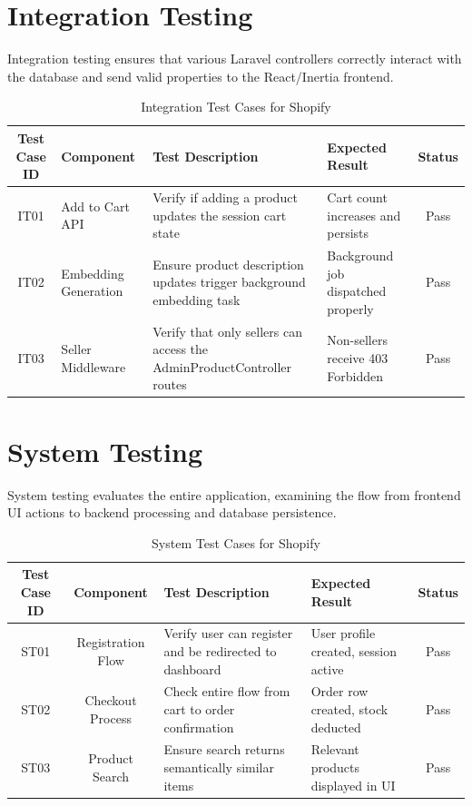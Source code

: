 \section{Integration Testing}
Integration testing ensures that various Laravel controllers correctly interact with the database and send valid properties to the React/Inertia frontend.
\begin{table}[H]
    \centering
    \renewcommand{\arraystretch}{1.3}
    \small
    \begin{tabular}{|c|p{3cm}|p{3cm}|p{3cm}|c|}
        \hline
        \textbf{Test Case ID} & \textbf{Component} & \textbf{Test Description} & \textbf{Expected Result} & \textbf{Status} \\
        \hline
        IT01 & Add to Cart API & Verify if adding a product updates the session cart state & Cart count increases and persists & Pass \\
        \hline
        IT02 & Embedding Generation & Ensure product description updates trigger background embedding task & Background job dispatched properly & Pass \\
        \hline
        IT03 & Seller Middleware & Verify that only sellers can access the AdminProductController routes & Non-sellers receive 403 Forbidden & Pass \\
        \hline
    \end{tabular}
    \caption{Integration Test Cases for Shopify}
    \label{tab:integration_tests}
\end{table}

\newpage
\section{System Testing}
System testing evaluates the entire application, examining the flow from frontend UI actions to backend processing and database persistence.
\begin{table}[H]
    \centering
    \renewcommand{\arraystretch}{1.3}
    \begin{tabular}{|c|c|p{4cm}|p{3cm}|c|}
        \hline
        \textbf{Test Case ID} & \textbf{Component} & \textbf{Test Description} & \textbf{Expected Result} & \textbf{Status} \\
        \hline
        ST01 & Registration Flow & Verify user can register and be redirected to dashboard & User profile created, session active & Pass \\
        \hline
        ST02 & Checkout Process & Check entire flow from cart to order confirmation & Order row created, stock deducted & Pass \\
        \hline
        ST03 & Product Search & Ensure search returns semantically similar items & Relevant products displayed in UI & Pass \\
        \hline
    \end{tabular}
    \caption{System Test Cases for Shopify}
    \label{tab:system_tests}
\end{table}

